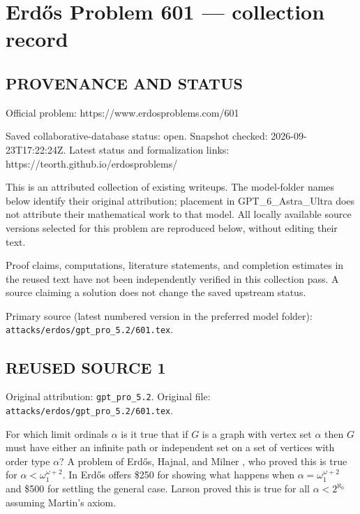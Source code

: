 \section*{Erd\H{o}s Problem 601 --- collection record}

\subsection*{PROVENANCE AND STATUS}
Official problem: https://www.erdosproblems.com/601

Saved collaborative-database status: open.
Snapshot checked: 2026-09-23T17:22:24Z.
Latest status and formalization links: https://teorth.github.io/erdosproblems/

This is an attributed collection of existing writeups. The model-folder names below identify their original attribution; placement in GPT\_6\_Astra\_Ultra does not attribute their mathematical work to that model. All locally available source versions selected for this problem are reproduced below, without editing their text.

Proof claims, computations, literature statements, and completion estimates in the reused text have not been independently verified in this collection pass. A source claiming a solution does not change the saved upstream status.

Primary source (latest numbered version in the preferred model folder): \texttt{attacks/erdos/gpt\_pro\_5.2/601.tex}.

\subsection*{REUSED SOURCE 1}
Original attribution: \texttt{gpt\_pro\_5.2}.
Original file: \texttt{attacks/erdos/gpt\_pro\_5.2/601.tex}.


For which limit ordinals $\alpha$ is it true that if $G$ is a graph with vertex set $\alpha$ then $G$ must have either an infinite path or independent set on a set of vertices with order type $\alpha$? A problem of Erd\H{o}s, Hajnal, and Milner \cite{EHM70}, who proved this is true for $\alpha < \omega_1^{\omega+2}$. In \cite{Er82e} Erd\H{o}s offers \$250 for showing what happens when $\alpha=\omega_1^{\omega+2}$ and \$500 for settling the general case. Larson \cite{La90} proved this is true for all $\alpha<2^{\aleph_0}$ assuming Martin's axiom.

